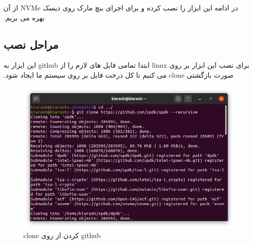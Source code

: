 ‫
‫در ادامه این ابزار را نصب کرده و برای اجرای بنچ مارک روی دیسک NVMe از آن بهره می بریم.
‫
‫‫\subsection*{مراحل نصب}
‫برای نصب این ابزار بر روی linux ابتدا تمامی فایل های لازم را از github این ابزار به صورت بازگشتی clone می کنیم تا کل درخت فایل بر روی سیستم ما ایجاد شود.

\begin{figure}[H]
    \centering
    \includegraphics[width=\textwidth]{figs/gitclone.png}
    \caption{clone کردن از روی github}
\end{figure}


